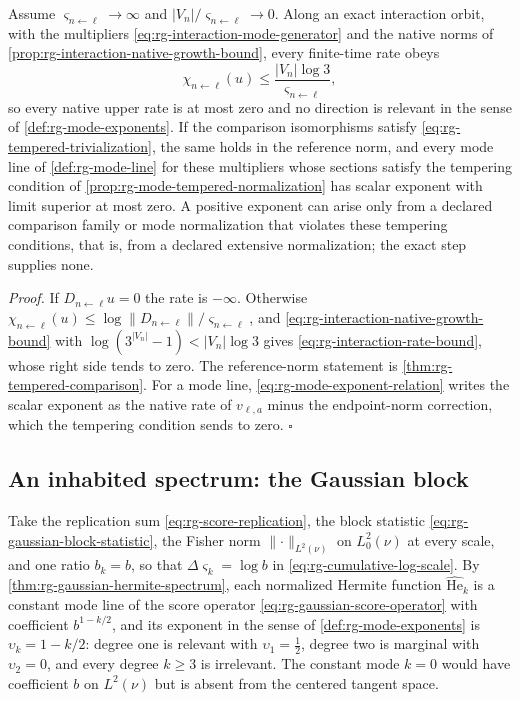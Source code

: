 Assume \(\varsigma_{n\leftarrow\ell}\to\infty\) and
\(\lvert V_n\rvert/\varsigma_{n\leftarrow\ell}\to0\). Along an exact
interaction orbit, with the multipliers \eqref{eq:rg-interaction-mode-generator}
and the native norms of \cref{prop:rg-interaction-native-growth-bound}, every
finite-time rate obeys
\begin{equation}
\chi_{n\leftarrow\ell}(u)\leq
\frac{\lvert V_n\rvert\log3}{\varsigma_{n\leftarrow\ell}},
\label{eq:rg-interaction-rate-bound}
\end{equation}
so every native upper rate is at most zero and no direction is relevant in the
sense of \cref{def:rg-mode-exponents}. If the comparison isomorphisms satisfy
\eqref{eq:rg-tempered-trivialization}, the same holds in the reference norm,
and every mode line of \cref{def:rg-mode-line} for these multipliers whose
sections satisfy the tempering condition of
\cref{prop:rg-mode-tempered-normalization} has scalar exponent with limit
superior at most zero. A positive exponent can arise only from a declared
comparison family or mode normalization that violates these tempering
conditions, that is, from a declared extensive normalization; the exact step
supplies none. 

\noindent\emph{Proof.}
If \(D_{n\leftarrow\ell}u=0\) the rate is \(-\infty\). Otherwise
\(\chi_{n\leftarrow\ell}(u)\leq\log\lVert D_{n\leftarrow\ell}\rVert/
\varsigma_{n\leftarrow\ell}\), and \eqref{eq:rg-interaction-native-growth-bound}
with \(\log(3^{\lvert V_n\rvert}-1)<\lvert V_n\rvert\log3\) gives
\eqref{eq:rg-interaction-rate-bound}, whose right side tends to zero. The
reference-norm statement is \cref{thm:rg-tempered-comparison}. For a mode
line, \eqref{eq:rg-mode-exponent-relation} writes the scalar exponent as the
native rate of \(v_{\ell,a}\) minus the endpoint-norm correction, which the
tempering condition sends to zero. \(\square\)

\subsection{An inhabited spectrum: the Gaussian block}

Take the replication sum \eqref{eq:rg-score-replication}, the block statistic
\eqref{eq:rg-gaussian-block-statistic}, the Fisher norm
\(\lVert\cdot\rVert_{L^2(\nu)}\) on \(L^2_0(\nu)\) at every scale, and one
ratio \(b_k=b\), so that \(\Delta\varsigma_k=\log b\) in
\eqref{eq:rg-cumulative-log-scale}. By
\cref{thm:rg-gaussian-hermite-spectrum}, each normalized Hermite function
\(\widehat{\mathrm{He}}_k\) is a constant mode line of the score operator
\eqref{eq:rg-gaussian-score-operator} with coefficient \(b^{1-k/2}\), and its
exponent in the sense of \cref{def:rg-mode-exponents} is
\(\upsilon_k=1-k/2\): degree one is relevant with \(\upsilon_1=\tfrac12\),
degree two is marginal with \(\upsilon_2=0\), and every degree \(k\geq3\) is
irrelevant. The constant mode \(k=0\) would have coefficient \(b\) on
\(L^2(\nu)\) but is absent from the centered tangent space.

